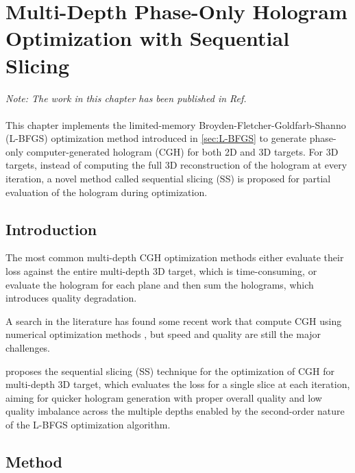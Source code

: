 \chapter{Multi-Depth Phase-Only Hologram Optimization with Sequential Slicing}\label{chapter:Multi-Depth Phase-Only Hologram Optimization}

\graphicspath{{Chapter_Multi_depth_optim/Figs/}}

\textit{Note: The work in this chapter has been published in Ref. \cite{Sha2023}}\\\\

This chapter implements the limited-memory Broyden-Fletcher-Goldfarb-Shanno (L-BFGS) optimization method introduced in \cref{sec:L-BFGS} to generate phase-only computer-generated hologram (CGH) for both 2D and 3D targets. For 3D targets, instead of computing the full 3D reconstruction of the hologram at every iteration, a novel method called sequential slicing (SS) is proposed for partial evaluation of the hologram during optimization.

\section{Introduction}
The most common multi-depth CGH optimization methods either evaluate their loss against the entire multi-depth 3D target, which is time-consuming, or evaluate the hologram for each plane and then sum the holograms, which introduces quality degradation.

A search in the literature has found some recent work that compute CGH using numerical optimization methods \cite{Zhang2017, Liu2020, Choi2021, Chen2021}, but speed and quality are still the major challenges.

proposes the sequential slicing (SS) technique for the optimization of CGH for multi-depth 3D target, which evaluates the loss for a single slice at each iteration, aiming for quicker hologram generation with proper overall quality and low quality imbalance across the multiple depths enabled by the second-order nature of the L-BFGS optimization algorithm.


\section{Method}



